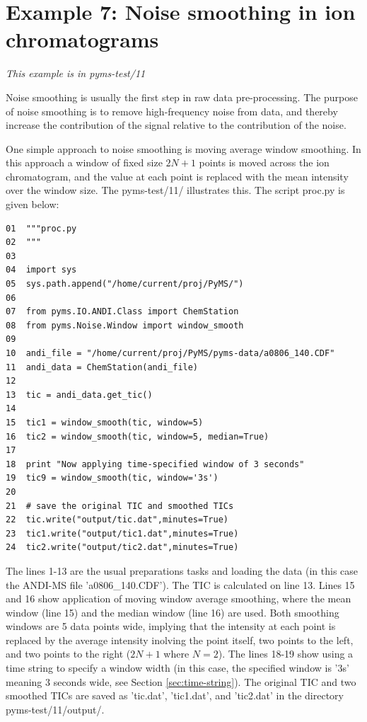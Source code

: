 \section{Example 7: Noise smoothing in ion chromatograms}

\noindent
{\em This example is in pyms-test/11}

Noise smoothing is usually the first step in raw data pre-processing. The
purpose of noise smoothing is to remove high-frequency noise from data, and
thereby increase the contribution of the signal relative to the contribution
of the noise.

One simple approach to noise smoothing is moving average window smoothing.
In this approach a window of fixed size $2N+1$ points is moved across the ion
chromatogram, and the value at each point is replaced with the mean intensity
over the window size. The pyms-test/11/ illustrates this. The script proc.py
is given below:

\begin{verbatim}
01  """proc.py
02  """
03  
04  import sys
05  sys.path.append("/home/current/proj/PyMS/")
06  
07  from pyms.IO.ANDI.Class import ChemStation
08  from pyms.Noise.Window import window_smooth
09  
10  andi_file = "/home/current/proj/PyMS/pyms-data/a0806_140.CDF"
11  andi_data = ChemStation(andi_file)
12  
13  tic = andi_data.get_tic()
14  
15  tic1 = window_smooth(tic, window=5)
16  tic2 = window_smooth(tic, window=5, median=True)
17  
18  print "Now applying time-specified window of 3 seconds"
19  tic9 = window_smooth(tic, window='3s')
20  
21  # save the original TIC and smoothed TICs
22  tic.write("output/tic.dat",minutes=True)
23  tic1.write("output/tic1.dat",minutes=True)
24  tic2.write("output/tic2.dat",minutes=True)
\end{verbatim}

\noindent
The lines 1-13 are the usual preparations tasks and loading the data (in this
case the ANDI-MS file 'a0806\_140.CDF'). The TIC is calculated on line 13.
Lines 15 and 16 show application of moving window average smoothing, where
the mean window (line 15) and the median window (line 16) are used. Both
smoothing windows are 5 data points wide, implying that the intensity at
each point is replaced by the average intensity inolving the point itself,
two points to the left, and two points to the right ($2N+1$ where $N=2$).
The lines 18-19 show using a time string to specify a window width (in
this case, the specified window is '3s' meaning 3 seconds wide, see
Section \ref{sec:time-string}).  The original TIC and two smoothed TICs are
saved as 'tic.dat', 'tic1.dat', and 'tic2.dat' in the directory
pyms-test/11/output/.

